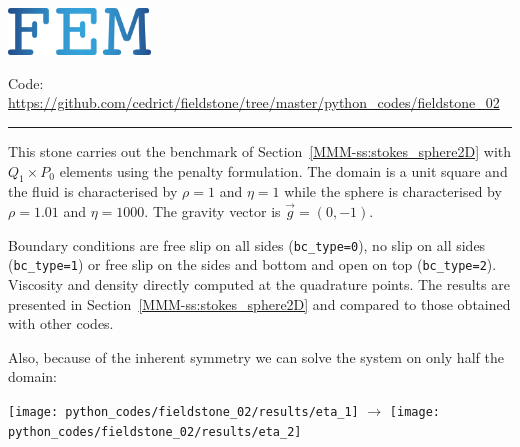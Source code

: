 \includegraphics[height=1.25cm]{images/pictograms/FEM}




\begin{center}
\inpython
{\small Code: \url{https://github.com/cedrict/fieldstone/tree/master/python_codes/fieldstone_02}}
\end{center}

\par\noindent\rule{\textwidth}{0.4pt}


This stone carries out the benchmark of Section~\ref{MMM-ss:stokes_sphere2D}
with $Q_1\times P_0$ elements using the penalty formulation.
The domain is a unit square and the fluid is characterised 
by $\rho=1$ and $\eta=1$ 
while the sphere is characterised 
by $\rho=1.01$ and $\eta=1000$.
The gravity vector is $\vec{g}=(0,-1)$. 

Boundary conditions are free slip on all sides ({\tt bc\_type=0}), 
no slip on all sides ({\tt bc\_type=1}) or free slip on the sides and bottom and open 
on top ({\tt bc\_type=2}).
Viscosity and density directly computed at the quadrature points.
The results are presented in Section~\ref{MMM-ss:stokes_sphere2D} and compared to 
those obtained with other codes.

Also, because of the inherent symmetry we can solve the system 
on only half the domain:
\begin{center}
\texttt{[image: python\_codes/fieldstone\_02/results/eta\_1]}
$\rightarrow$
\texttt{[image: python\_codes/fieldstone\_02/results/eta\_2]}
\end{center}

